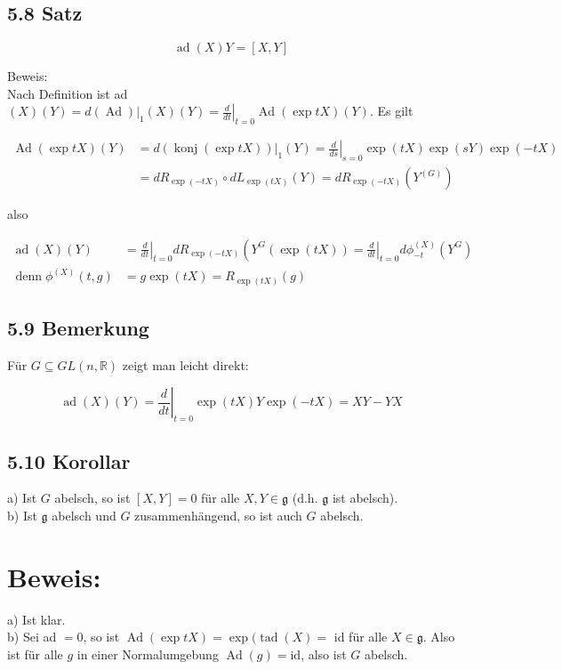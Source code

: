 \documentclass[10pt, letterpaper]{article}
\begin{document}
\subsection*{5.8 Satz}
$$
\operatorname{ad}(X) Y=[X, Y]
$$

Beweis:\\
Nach Definition ist ad $(X)(Y)=\left.d(\operatorname{Ad})\right|_{1}(X)(Y)=\left.\frac{d}{d t}\right|_{t=0} \operatorname{Ad}(\exp t X)(Y)$. Es gilt

$$
\begin{aligned}
\operatorname{Ad}(\exp t X)(Y) & =\left.d(\operatorname{konj}(\exp t X))\right|_{1}(Y)=\left.\frac{d}{d s}\right|_{s=0} \exp (t X) \exp (s Y) \exp (-t X) \\
& =d R_{\exp (-t X)} \circ d L_{\exp (t X)}(Y)=d R_{\exp (-t X)}\left(Y^{(G)}\right)
\end{aligned}
$$

also

$$
\begin{aligned}
\operatorname{ad}(X)(Y) & =\left.\frac{d}{d t}\right|_{t=0} d R_{\exp (-t X)}\left(Y^{G}(\exp (t X))=\left.\frac{d}{d t}\right|_{t=0} d \phi_{-t}^{(X)}\left(Y^{G}\right)\right. \\
\operatorname{denn} \phi^{(X)}(t, g) & =g \exp (t X)=R_{\exp (t X)}(g)
\end{aligned}
$$

\subsection*{5.9 Bemerkung}
Für $G \subseteq G L(n, \mathbb{R})$ zeigt man leicht direkt:

$$
\operatorname{ad}(X)(Y)=\left.\frac{d}{d t}\right|_{t=0} \exp (t X) Y \exp (-t X)=X Y-Y X
$$

\subsection*{5.10 Korollar}
a) Ist $G$ abelsch, so ist $[X, Y]=0$ für alle $X, Y \in \mathfrak{g}$ (d.h. $\mathfrak{g}$ ist abelsch).\\
b) Ist $\mathfrak{g}$ abelsch und $G$ zusammenhängend, so ist auch $G$ abelsch.

\section*{Beweis:}
a) Ist klar.\\
b) Sei ad $=0$, so ist $\operatorname{Ad}(\exp t X)=\exp (\operatorname{tad}(X)=$ id für alle $X \in \mathfrak{g}$. Also ist für alle $g$ in einer Normalumgebung $\operatorname{Ad}(g)=\mathrm{id}$, also ist $G$ abelsch.
\end{document}
